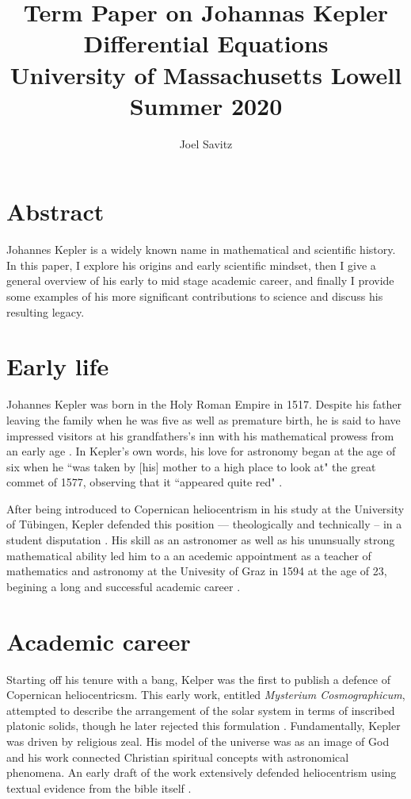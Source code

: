 \documentclass[11pt]{article}
\title{Term Paper on Johannas Kepler \\
\small Differential Equations \\
University of Massachusetts Lowell \\
Summer 2020}
\author{Joel Savitz}
\begin{document}
\maketitle

\section{Abstract}

Johannes Kepler is a widely known name
in mathematical and scientific history.
In this paper, I explore his origins
and early scientific mindset,
then I give a general overview of
his early to mid stage academic career,
and finally I provide some examples
of his more significant contributions
to science and discuss his resulting legacy.

\section{Early life}

Johannes Kepler was born in the Holy Roman Empire in 1517.
Despite his father leaving the family when he was five
as well as premature birth, 
he is said to have impressed visitors at his
grandfathers's inn with his mathematical prowess
from an early age \cite{caspar}.
In Kepler's own words,
his love for astronomy began at the age of six
when he ``was taken by [his] mother to a high place to look at"
the great commet of 1577, observing that
it ``appeared quite red" \cite{koestler}.


After being introduced to Copernican heliocentrism
in his study at the University of Tübingen,
Kepler defended this position
--- theologically and technically --
in a student disputation \cite{westman}.
His skill as an astronomer as well as
his ununsually strong mathematical ability
led him to a an acedemic appointment
as a teacher of mathematics and astronomy
at the Univesity of Graz in 1594
at the age of 23,
begining a long and successful academic career \cite{caspar}.

\section{Academic career}

Starting off his tenure with a bang,
Kelper was the first to publish a defence
of Copernican heliocentricsm.
This early work,
entitled \textit{Mysterium Cosmographicum},
attempted to describe
the arrangement of the solar system
in terms of inscribed platonic solids,
though he later rejected this formulation \cite{caspar}.
Fundamentally, Kepler was driven by religious zeal.
His model of the universe was as an image of God
and his work connected Christian spiritual concepts
with astronomical phenomena.
An early draft of the work
extensively defended heliocentrism
using textual evidence from the bible itself \cite{barker}.
\end{document}
